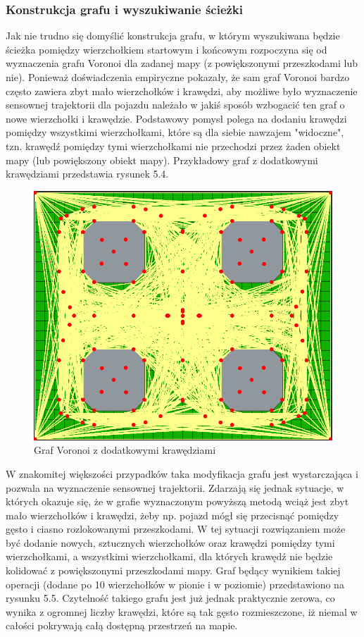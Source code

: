 \documentclass[a4paper,11pt,twoside]{report}
\theoremstyle{definition}
\begin{document}
\subsubsection{Konstrukcja grafu i wyszukiwanie ścieżki}

Jak nie trudno się domyślić konstrukcja grafu, w którym wyszukiwana będzie ścieżka pomiędzy wierzchołkiem startowym i końcowym rozpoczyna się od wyznaczenia grafu Voronoi dla zadanej mapy (z powiększonymi przeszkodami lub nie). Ponieważ doświadczenia empiryczne pokazały, że sam graf Voronoi bardzo często zawiera zbyt mało wierzchołków i krawędzi, aby możliwe było wyznaczenie sensownej trajektorii dla pojazdu należało w jakiś sposób wzbogacić ten graf o nowe wierzchołki i krawędzie. Podstawowy pomysł polega na dodaniu krawędzi pomiędzy wszystkimi wierzchołkami, które są dla siebie nawzajem "widoczne", tzn. krawędź pomiędzy tymi wierzchołkami nie przechodzi przez żaden obiekt mapy (lub powiększony obiekt mapy). Przykładowy graf z dodatkowymi krawędziami przedstawia rysunek 5.4.

\begin{figure}[h!]
\centering
\includegraphics[scale=0.4]{fullVoronoiGraphForExpandedMap}
\caption[Graf Voronoi z dodatkowymi krawędziami]{Graf Voronoi z dodatkowymi krawędziami}
\end{figure}

W znakomitej większości przypadków taka modyfikacja grafu jest wystarczająca i pozwala na wyznaczenie sensownej trajektorii. Zdarzają się jednak sytuacje, w których okazuje się, że w grafie wyznaczonym powyższą metodą wciąż jest zbyt mało wierzchołków i krawędzi, żeby np. pojazd mógł się przecisnąć pomiędzy gęsto i ciasno rozlokowanymi przeszkodami. W tej sytuacji rozwiązaniem może być dodanie nowych, sztucznych wierzchołków oraz krawędzi pomiędzy tymi wierzchołkami, a wszystkimi wierzchołkami, dla których krawędź nie będzie kolidować z powiększonymi przeszkodami mapy. Graf będący wynikiem takiej operacji (dodane po 10 wierzchołków w pionie i w poziomie) przedstawiono na rysunku 5.5. Czytelność takiego grafu jest już jednak praktycznie zerowa, co wynika z ogromnej liczby krawędzi, które są tak gęsto rozmieszczone, iż niemal w całości pokrywają całą dostępną przestrzeń na mapie.
\end{document}
